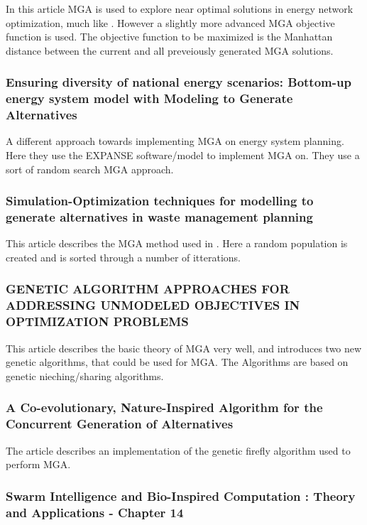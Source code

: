 In this article MGA is used to explore near optimal solutions in energy network optimization, much like \cite{DeCarolis_MGA}. However a slightly more advanced MGA objective function is used. The objective function to be maximized is the Manhattan distance between the current and all preveiously generated MGA solutions. 

\subsubsection{Ensuring diversity of national energy scenarios: Bottom-up energy
system model with Modeling to Generate Alternatives \cite{BERNTSEN2017886}}
A different approach towards implementing MGA on energy system planning. Here they use the  EXPANSE software/model to implement MGA on. They use a sort of random search MGA approach.

\subsubsection{Simulation-Optimization techniques for
modelling to generate alternatives in waste
management planning\cite{Yavuz2011}}
This article describes the MGA method used in \cite{BERNTSEN2017886}. Here a random population is created and is sorted through a number of itterations. 

\subsubsection{GENETIC ALGORITHM APPROACHES FOR ADDRESSING UNMODELED OBJECTIVES IN OPTIMIZATION PROBLEMS \cite{Genetic_Algorithms_for_MGA}}
This article describes the basic theory of MGA very well, and introduces two new genetic algorithms, that could be used for MGA. The Algorithms are based on genetic nieching/sharing algorithms. 

\subsubsection{A Co-evolutionary, Nature-Inspired Algorithm for the Concurrent Generation of Alternatives \cite{FireFly_MGA_Article}}

The article \cite{FireFly_MGA_Article} describes an implementation of the genetic firefly algorithm used to perform MGA. 

\subsubsection{Swarm Intelligence and Bio-Inspired Computation : Theory and Applications - Chapter 14 \cite{Bio_computation_book}}

